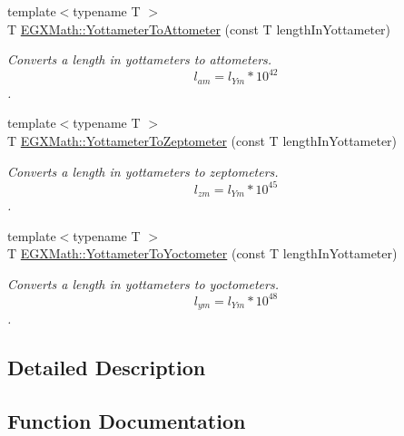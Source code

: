 \begin{DoxyCompactItemize}
{\footnotesize template$<$typename T $>$ }\\T \mbox{\hyperlink{group___e_g_x_math-_conversions-_length_conversions-_yottameter-_s_i_gad04f66f8ca146161e2a36525bb887a5b}{E\+G\+X\+Math\+::\+Yottameter\+To\+Attometer}} (const T length\+In\+Yottameter)
\begin{DoxyCompactList}\small\item\em Converts a length in yottameters to attometers. \[ l_{am}=l_{Ym} * 10^{42} \]. \end{DoxyCompactList}\item 
{\footnotesize template$<$typename T $>$ }\\T \mbox{\hyperlink{group___e_g_x_math-_conversions-_length_conversions-_yottameter-_s_i_ga976c591d436c20684f2d55461a05da3e}{E\+G\+X\+Math\+::\+Yottameter\+To\+Zeptometer}} (const T length\+In\+Yottameter)
\begin{DoxyCompactList}\small\item\em Converts a length in yottameters to zeptometers. \[ l_{zm}=l_{Ym} * 10^{45} \]. \end{DoxyCompactList}\item 
{\footnotesize template$<$typename T $>$ }\\T \mbox{\hyperlink{group___e_g_x_math-_conversions-_length_conversions-_yottameter-_s_i_ga946a366f9c912aaa81ab052567f86bc2}{E\+G\+X\+Math\+::\+Yottameter\+To\+Yoctometer}} (const T length\+In\+Yottameter)
\begin{DoxyCompactList}\small\item\em Converts a length in yottameters to yoctometers. \[ l_{ym}=l_{Ym} * 10^{48} \]. \end{DoxyCompactList}\end{DoxyCompactItemize}


\subsection{Detailed Description}


\subsection{Function Documentation}
\mbox{\label{group___e_g_x_math-_conversions-_length_conversions-_yottameter-_s_i_gad04f66f8ca146161e2a36525bb887a5b}} 
